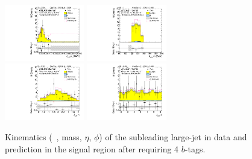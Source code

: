 \begin{figure}[htbp!]
\begin{center}
\includegraphics[width=0.31\textwidth,angle=-90]{figures/boosted/Signal/b77_FourTag_Signal_sublHCand_Pt_m.pdf}
\includegraphics[width=0.31\textwidth,angle=-90]{figures/boosted/Signal/b77_FourTag_Signal_sublHCand_Mass_s.pdf}\\
\includegraphics[width=0.31\textwidth,angle=-90]{figures/boosted/Signal/b77_FourTag_Signal_sublHCand_Eta.pdf}
\includegraphics[width=0.31\textwidth,angle=-90]{figures/boosted/Signal/b77_FourTag_Signal_sublHCand_Phi.pdf}
  \caption{Kinematics (\pt~, mass, $\eta$, $\phi$) of the subleading large-\R jet in data and prediction in the signal region after requiring 4 $b$-tags. }
  \label{fig:boosted-4b-signal-ak10-subl}
\end{center}
\end{figure}

